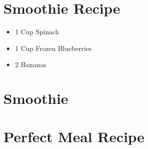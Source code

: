 \documentclass[a4paper,12pt]{book}
\begin{document}
\blindtext

\endgroup

\section{Smoothie Recipe}
\begin{itemize}
	\item 1 Cup Spinach
	\item 1 Cup Frozen Blueberries 
	\item 2 Bananas 
\end{itemize}


\section{Smoothie}
\blindtext[2]

\section{Perfect Meal Recipe}
\blindtext[2]
\end{document}
